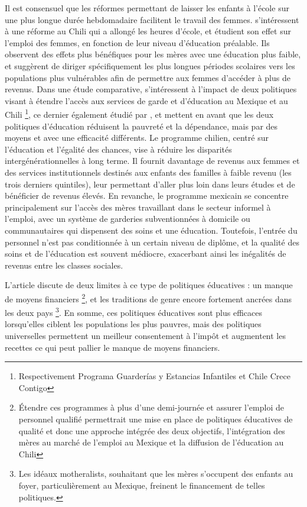 \documentclass[pagesize, twoside=off, bibliography=totoc, DIV=calc, fontsize=12pt, a4paper, french]{scrartcl}
\begin{document}
Il est consensuel que les réformes permettant de laisser les enfants à l’école sur une plus longue durée hebdomadaire facilitent le travail des femmes.  s’intéressent à une réforme au Chili qui a allongé les heures d’école, et étudient son effet sur l’emploi des femmes, en fonction de leur niveau d’éducation préalable. Ils observent des effets plus bénéfiques pour les mères avec une éducation plus faible, et suggèrent de diriger spécifiquement les plus longues périodes scolaires vers les populations plus vulnérables afin de permettre aux femmes d’accéder à plus de revenus. Dans une étude comparative, \citet{staab_putting_2011} s’intéressent à l’impact de deux politiques visant à étendre l’accès aux services de garde et d’éducation au Mexique et au Chili \footnote{Respectivement  Programa Guarderías y Estancias Infantiles et Chile Crece Contigo}, ce dernier également étudié par \citet{berthelon_school_2023}, et mettent en avant que les deux politiques d’éducation réduisent la pauvreté et la dépendance, mais par des moyens et avec une efficacité différents. Le programme chilien, centré sur l’éducation et l’égalité des chances, vise à réduire les disparités intergénérationnelles à long terme. Il fournit davantage de revenus aux femmes et des services institutionnels destinés aux enfants des familles à faible revenu (les trois derniers quintiles), leur permettant d’aller plus loin dans leurs études et de bénéficier de revenus élevés. En revanche, le programme mexicain se concentre principalement sur l’accès des mères travaillant dans le secteur informel à l’emploi, avec un système de garderies subventionnées à domicile ou communautaires qui dispensent des soins et une éducation. Toutefois, l’entrée du personnel n’est pas conditionnée à un certain niveau de diplôme, et la qualité des soins et de l’éducation est souvent médiocre, exacerbant ainsi les inégalités de revenus entre les classes sociales.

L’article discute de deux limites à ce type de politiques éducatives : un manque de moyens financiers \footnote{Étendre ces programmes à plus d’une demi-journée et assurer l’emploi de personnel qualifié permettrait une mise en place de politiques éducatives de qualité et donc une approche intégrée des deux objectifs, l’intégration des mères au marché de l’emploi au Mexique et la diffusion de l’éducation au Chili}, et les traditions de genre encore fortement ancrées dans les deux pays \footnote{Les idéaux motheralists, souhaitant que les mères s’occupent des enfants au foyer, particulièrement au Mexique, freinent le financement de telles politiques.}. En somme, ces politiques éducatives sont plus efficaces lorsqu’elles ciblent les populations les plus pauvres, mais des politiques universelles permettent un meilleur consentement à l’impôt et augmentent les recettes ce qui peut pallier le manque de moyens financiers.
\end{document}
